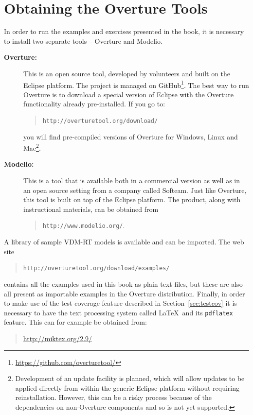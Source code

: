 \section{Obtaining the Overture Tools}\label{sec:install}

In order to run the examples and exercises presented in the book, it
is necessary to install two separate tools -- Overture and Modelio.
\begin{description}
\item[\textbf{Overture:}] This
 is an open source tool, developed by volunteers and built on
the Eclipse platform. The project is managed on
GitHub\footnote{\url{https://github.com/overturetool/}}.
The best way to run Overture is to download a special version of
Eclipse with the Overture functionality already pre-installed. If you
go to:
  \begin{quote}
  \texttt{http://overturetool.org/download/}
  \end{quote}
  \noindent you will find pre-compiled versions of Overture for
  Windows, Linux and Mac\footnote{Development of an update facility is planned, which will allow updates to be applied directly from within the generic Eclipse platform without requiring reinstallation. However, this
    can be a risky process because of the dependencies on non-Overture
    components and so is not yet supported.}.

\item[\textbf{Modelio:}] This is a tool that is available both in a commercial version as well as in an open source setting from a
  company called Softeam. Just like Overture, this tool is built on top of the Eclipse platform. The product, along with instructional materials, can be
  obtained from
\begin{quote}
\texttt{http://www.modelio.org/}.
\end{quote}
\end{description}

A library of sample VDM-RT models is available and can be imported.  The web site
%
\begin{quote}
\texttt{http://overturetool.org/download/examples/}
\end{quote}
%
contains all the examples used in this book
as plain text files, but these are also all present as importable examples in the Overture distribution. Finally, in order to make use of the
test coverage feature described in Section~\ref{sec:testcov} it is
necessary to have the text processing system called \LaTeX\ and its
\texttt{pdflatex} feature. This can for example be obtained from:
\begin{quote}
\url{http://miktex.org/2.9/}
\end{quote}

